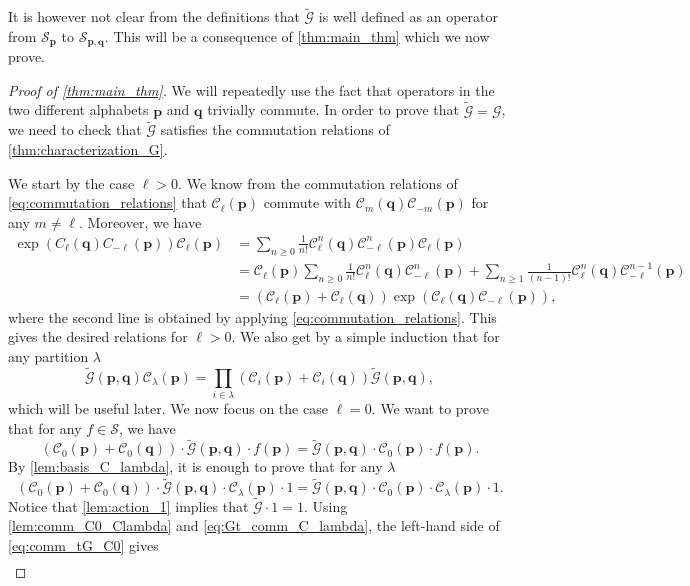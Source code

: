 \documentclass[12pt]{amsart}
\theoremstyle{remark}
\newcommand{\bfp}{\boldsymbol{p}}
\newcommand{\bfq}{\boldsymbol{q}}
\newcommand{\G}{\mathcal G}
\newcommand{\tG}{\widetilde{\mathcal G}}
\newcommand{\C}{\mathcal C}
\newcommand{\mcS}{\mathcal{S}}
\begin{document}
It is however not clear from the definitions that $\tG$ is well defined as an operator from $\mcS_{\bfp}$ to $\mcS_{\bfp,\bfq}$. This will be a consequence of \cref{thm:main_thm} which we now prove.
\begin{proof}[Proof of \cref{thm:main_thm}]
We will repeatedly use the fact that operators in the two different alphabets $\bfp$ and $\bfq$ trivially commute.
    In order to prove that $\tG=\G$, we need to check that $\tG$ satisfies the commutation relations of \cref{thm:characterization_G}.

We start by the case $\ell>0$.
We know from the commutation relations of \cref{eq:commutation_relations} that $\C_\ell(\bfp)$ commute with $\C_m(\bfq)\C_{-m}(\bfp)$ for any $m\neq \ell$. Moreover, we have
\begin{align*}
\exp\left(C_\ell(\bfq)C_{-\ell}(\bfp)\right)\C_\ell(\bfp)
&=\sum_{n\geq 0}\frac{1}{n!}
\C_\ell^n(\bfq)\C_{-\ell}^n(\bfp)\C_\ell(\bfp)\\
&=\C_\ell(\bfp)\sum_{n\geq 0}\frac{1}{n!}
\C_\ell^n(\bfq)\C_{-\ell}^n(\bfp)+
\sum_{n\geq 1}\frac{1}{(n-1)!}
\C_\ell^n(\bfq)\C_{-\ell}^{n-1}(\bfp)\\
&=\left(\C_\ell(\bfp)+\C_\ell(\bfq)\right)\exp\left(\C_\ell(\bfq)\C_{-\ell}(\bfp)\right),
\end{align*}
where the second line is obtained by applying \cref{eq:commutation_relations}. 
This gives the desired relations for $\ell>0$. We also get by a simple induction that for any partition $\lambda$
\begin{equation}\label{eq:Gt_comm_C_lambda}
\tG(\bfp,\bfq)\C_\lambda(\bfp)=\prod_{i\in\lambda}\left(\C_i(\bfp)+\C_i(\bfq)\right)\tG(\bfp,\bfq), 
\end{equation}
which will be useful later. We now focus on the case $\ell=0$. We want to prove that for any $f\in\mcS$, we have
$$\left(\C_{0}(\bfp)+\C_{0}(\bfq)\right)\cdot \tG(\bfp,\bfq)\cdot f(\bfp)=\tG(\bfp,\bfq)\cdot \C_{0}(\bfp)\cdot f(\bfp).$$
By \cref{lem:basis_C_lambda}, it is enough to prove that for any $\lambda$
\begin{equation}\label{eq:comm_tG_C0}
  \left(\C_{0}(\bfp)+\C_{0}(\bfq)\right)\cdot \tG(\bfp,\bfq)\cdot \C_\lambda(\bfp)\cdot 1=\tG(\bfp,\bfq)\cdot \C_{0}(\bfp)\cdot \C_\lambda(\bfp)\cdot 1.  
\end{equation}
Notice that \cref{lem:action_1} implies that $\tG\cdot 1=1$.
Using \cref{lem:comm_C0_Clambda} and \cref{eq:Gt_comm_C_lambda}, the left-hand side of \cref{eq:comm_tG_C0} gives
\begin{align*}

\end{align*}
\end{proof}
\end{document}
